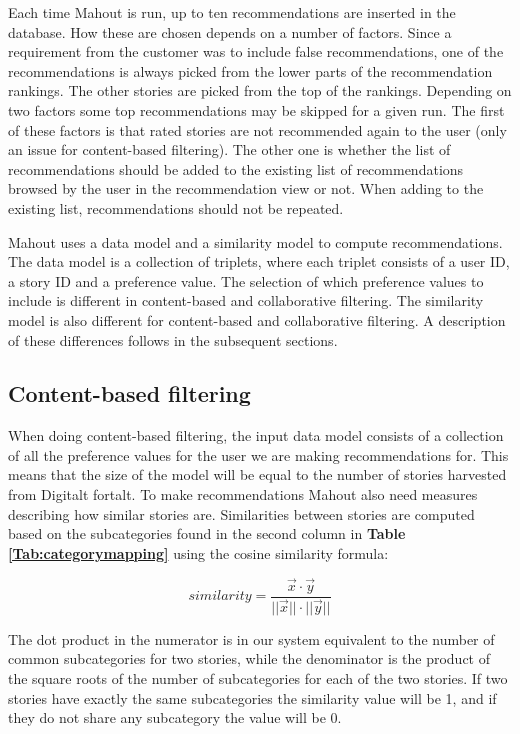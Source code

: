 Each time Mahout is run, up to ten recommendations are inserted in the database. How these are chosen depends on a number of factors. Since a requirement from the customer was to include false recommendations, one of the recommendations is always picked from the lower parts of the recommendation rankings. The other stories are picked from the top of the rankings. Depending on two factors some top recommendations may be skipped for a given run. The first of these factors is that rated stories are not recommended again to the user (only an issue for content-based filtering). The other one is whether the list of recommendations should be added to the existing list of recommendations browsed by the user in the recommendation view or not. When adding to the existing list, recommendations should not be repeated.\newline

Mahout uses a data model and a similarity model to compute recommendations. The data model is a collection of triplets, where each triplet consists of a user ID, a story ID and a preference value. The selection of which preference values to include is different in content-based and collaborative filtering. The similarity model is also different for content-based and collaborative filtering. A description of these differences follows in the subsequent sections.    

\subsection{Content-based filtering}

When doing content-based filtering, the input data model consists of a collection of all the preference values for the user we are making recommendations for. This means that the size of the model will be equal to the number of stories harvested from Digitalt fortalt. To make recommendations Mahout also need measures describing how similar stories are. Similarities between stories are computed based on the subcategories found in the second column in \textbf{Table \ref{Tab:categorymapping}} using the cosine similarity formula: 

\begin{equation}
similarity = \frac{\vec{x}\cdot\vec{y}}{||\vec{x}||\cdot||\vec{y}||}
\end{equation}

The dot product in the numerator is in our system equivalent to the number of common subcategories for two stories, while the denominator is the product of the square roots of the number of subcategories for each of the two stories. If two stories have exactly the same subcategories the similarity value will be 1, and if they do not share any subcategory the value will be 0. \newline

